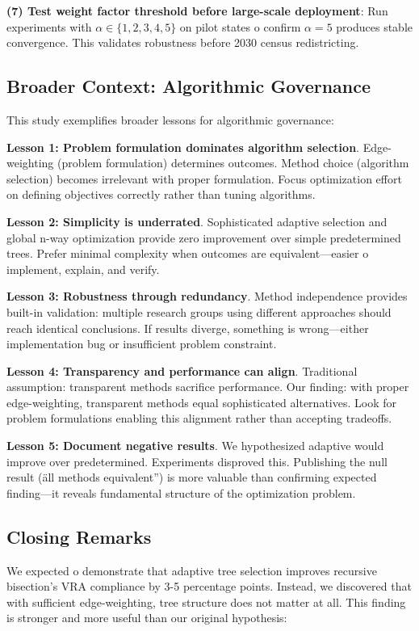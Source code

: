 \textbf{(7) Test weight factor threshold before large-scale deployment}: Run experiments with $\alpha \in \{1, 2, 3, 4, 5\}$ on pilot states 	o confirm $\alpha = 5$ produces stable convergence. This validates robustness before 2030 census redistricting.

\subsection{Broader Context: Algorithmic Governance}

This study exemplifies broader lessons for algorithmic governance:

\textbf{Lesson 1: Problem formulation dominates algorithm selection}. Edge-weighting (problem formulation) determines outcomes. Method choice (algorithm selection) becomes irrelevant with proper formulation. Focus optimization effort on defining objectives correctly rather than tuning algorithms.

\textbf{Lesson 2: Simplicity is underrated}. Sophisticated adaptive selection and global n-way optimization provide zero improvement over simple predetermined trees. Prefer minimal complexity when outcomes are equivalent—easier 	o implement, explain, and verify.

\textbf{Lesson 3: Robustness through redundancy}. Method independence provides built-in validation: multiple research groups using different approaches should reach identical conclusions. If results diverge, something is wrong—either implementation bug or insufficient problem constraint.

\textbf{Lesson 4: Transparency and performance can align}. Traditional assumption: transparent methods sacrifice performance. Our finding: with proper edge-weighting, transparent methods equal sophisticated alternatives. Look for problem formulations enabling this alignment rather than accepting tradeoffs.

\textbf{Lesson 5: Document negative results}. We hypothesized adaptive would improve over predetermined. Experiments disproved this. Publishing the null result (\"all methods equivalent'') is more valuable than confirming expected finding—it reveals fundamental structure of the optimization problem.

\subsection{Closing Remarks}

We expected 	o demonstrate that adaptive tree selection improves recursive bisection's VRA compliance by 3-5 percentage points. Instead, we discovered that with sufficient edge-weighting, tree structure does not matter at all. This finding is stronger and more useful than our original hypothesis:

